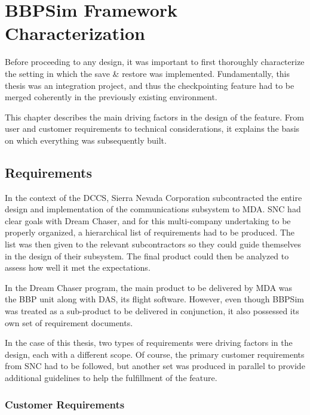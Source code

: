 {
\setlength{\parindent}{2em}
\chapter{BBPSim Framework Characterization}\label{cha:sim-env}
Before proceeding to any design, it was important to first thoroughly characterize the setting in which the save \& restore was implemented. Fundamentally, this thesis was an integration project, and thus the checkpointing feature had to be merged coherently in the previously existing environment.

This chapter describes the main driving factors in the design of the feature. From user and customer requirements to technical considerations, it explains the basis on which everything was subsequently built.

\section{Requirements}\label{sec:reqs}
In the context of the \gls{DCCS}, Sierra Nevada Corporation subcontracted the entire design and implementation of the communications subsystem to \gls{MDA}. \gls{SNC} had clear goals with Dream Chaser, and for this multi-company undertaking to be properly organized, a hierarchical list of requirements had to be produced. The list was then given to the relevant subcontractors so they could guide themselves in the design of their subsystem. The final product could then be analyzed to assess how well it met the expectations. 

In the Dream Chaser program, the main product to be delivered by \gls{MDA} was the \gls{BBP} unit along with \gls{DAS}, its flight software. However, even though \gls{BBPSim} was treated as a sub-product to be delivered in conjunction, it also possessed its own set of requirement documents.

In the case of this thesis, two types of requirements were driving factors in the design, each with a different scope. Of course, the primary customer requirements from \gls{SNC} had to be followed, but another set was produced in parallel to provide additional guidelines to help the fulfillment of the feature.  

\subsection*{Customer Requirements}

}

